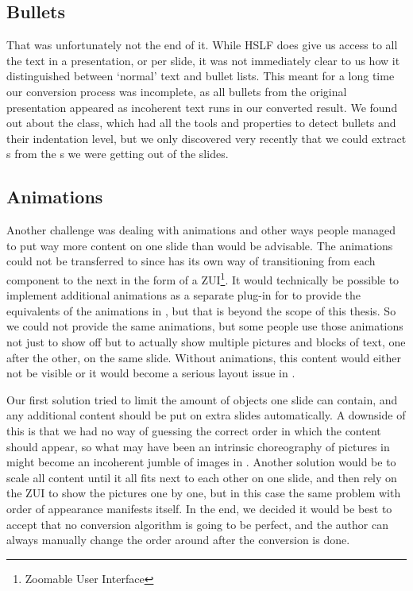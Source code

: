    \subsection{Bullets}

    That was unfortunately not the end of it. While HSLF does give us access to
    all the text in a presentation, or per slide, it was not immediately clear
    to us how it distinguished between `normal' text and bullet lists. This
    meant for a long time our conversion process was incomplete, as all bullets
    from the original \ppt presentation appeared as incoherent text runs in our
    converted result. We found out about the  class, which
    had all the tools and properties to detect bullets and their indentation
    level, but we only discovered very recently that we could extract
    s from the s we were getting out of the
    slides.


   \subsection{Animations}

    Another challenge was dealing with animations and other ways people managed
    to put way more content on one slide than would be advisable. The
    animations could not be transferred to \mxp since \mxp has its own way of
    transitioning from each component to the next in the form of a
    ZUI\footnote{Zoomable User Interface}. It would technically be possible to
    implement additional animations as a separate plug-in for \mxp to provide
    the equivalents of the animations in \ppt*, but that is beyond the scope of
    this thesis. So we could not provide the same animations, but some people
    use those animations not just to show off but to actually show multiple
    pictures and blocks of text, one after the other, on the same slide.
    Without animations, this content would either not be visible or it would
    become a serious layout issue in \mxp.
   
    Our first solution tried to limit the amount of objects one slide can
    contain, and any additional content should be put on extra slides
    automatically. A downside of this is that we had no way of guessing the
    correct order in which the content should appear, so what may have been an
    intrinsic choreography of pictures in \ppt might become an incoherent
    jumble of images in \mxp. Another solution would be to scale all content
    until it all fits next to each other on one slide, and then rely on the ZUI
    to show the pictures one by one, but in this case the same problem with
    order of appearance manifests itself. In the end, we decided it would be
    best to accept that no conversion algorithm is going to be perfect, and the
    author can always manually change the order around after the conversion is
    done.

